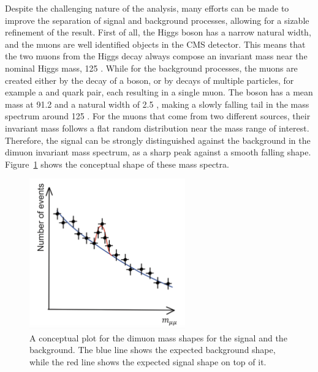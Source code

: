 Despite the challenging nature of the \hmm analysis, many efforts can be made to improve the separation of signal and background processes, 
allowing for a sizable refinement of the result.
First of all, the Higgs boson has a narrow natural width, and the muons are well identified objects in the CMS detector.
This means that the two muons from the Higgs decay always compose an invariant mass near the nominal Higgs mass, 125 \GeV.
While for the background processes, the muons are created either by the decay of a \PZ boson, 
or by decays of multiple particles, for example a \Pqt and \Paqt quark pair, each resulting in a single muon.
The \PZ boson has a mean mass at 91.2 \GeV and a natural width of 2.5 \GeV, making a slowly falling tail in the mass spectrum around 125 \GeV.
For the muons that come from two different sources, their invariant mass follows a flat random distribution near the mass range of interest.
Therefore, the signal can be strongly distinguished against the background in the dimuon invariant mass spectrum, 
as a sharp peak against a smooth falling shape. Figure~\ref{fig:dimuon_mass_shapes} shows the conceptual shape of these mass spectra. 

\begin{figure}[!htb]
    \centering
    \captionsetup{justification=justified}
    \includegraphics[width=0.6\textwidth]{pics/hmm_mass_sketch.png}
    \caption{A conceptual plot for the dimuon mass shapes for the signal and the background. 
             The blue line shows the expected background shape, while the red line shows the expected signal shape on top of it.}
    \label{fig:dimuon_mass_shapes}
\end{figure}

